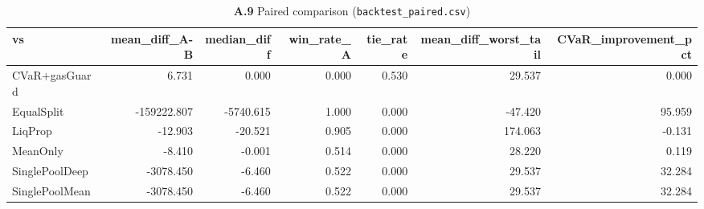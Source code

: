 \documentclass[11pt,a4paper]{article}
\theoremstyle{remark}
\newcommand{\code}[1]{\texttt{#1}}
\begin{document}
\begin{landscape}
\begin{table}[H]
\centering
\caption*{\textbf{A.9} Paired comparison (\code{backtest\_paired.csv})}
\scriptsize
\begin{tabular}{@{}lrrrrrr@{}}
\toprule
vs & mean\_diff\_A-B & median\_diff & win\_rate\_A & tie\_rate & mean\_diff\_worst\_tail &
CVaR\_improvement\_pct \\
\midrule
CVaR+gasGuard & 6.731 & 0.000 & 0.000 & 0.530 & 29.537 & 0.000 \\
EqualSplit & -159222.807 & -5740.615 & 1.000 & 0.000 & -47.420 & 95.959 \\
LiqProp & -12.903 & -20.521 & 0.905 & 0.000 & 174.063 & -0.131 \\
MeanOnly & -8.410 & -0.001 & 0.514 & 0.000 & 28.220 & 0.119 \\
SinglePoolDeep & -3078.450 & -6.460 & 0.522 & 0.000 & 29.537 & 32.284 \\
SinglePoolMean & -3078.450 & -6.460 & 0.522 & 0.000 & 29.537 & 32.284 \\
\bottomrule
\end{tabular}
\end{table}


\end{landscape}
\end{document}

